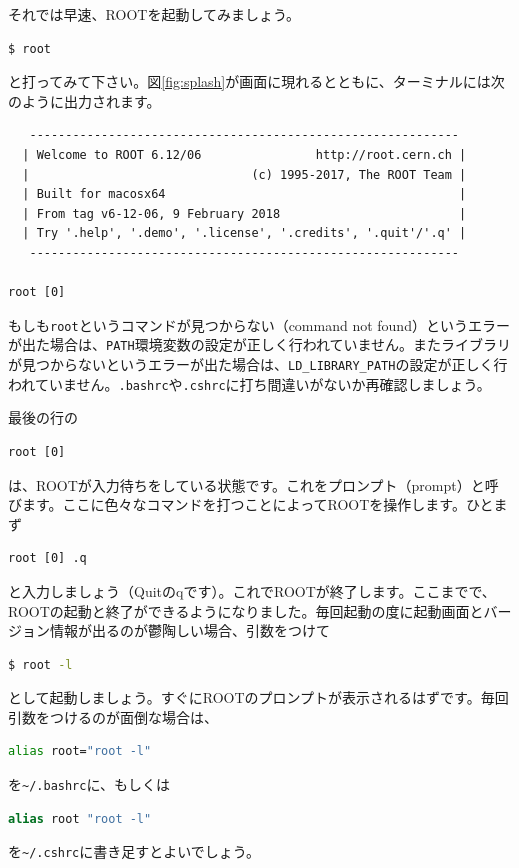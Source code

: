 それでは早速、ROOTを起動してみましょう。
\begin{lstlisting}[language=bash]
$ root
\end{lstlisting}
と打ってみて下さい。図\ref{fig:splash}が画面に現れるとともに、ターミナルには次のように出力されます。
\begin{lstlisting}
   ------------------------------------------------------------
  | Welcome to ROOT 6.12/06                http://root.cern.ch |
  |                               (c) 1995-2017, The ROOT Team |
  | Built for macosx64                                         |
  | From tag v6-12-06, 9 February 2018                         |
  | Try '.help', '.demo', '.license', '.credits', '.quit'/'.q' |
   ------------------------------------------------------------

root [0] 
\end{lstlisting}
もしも\texttt{root}というコマンドが見つからない（command not found）というエラーが出た場合は、\texttt{PATH}環境変数の設定が正しく行われていません。またライブラリが見つからないというエラーが出た場合は、\texttt{LD\_LIBRARY\_PATH}の設定が正しく行われていません。\texttt{.bashrc}や\texttt{.cshrc}に打ち間違いがないか再確認しましょう。

最後の行の
\begin{lstlisting}
root [0]
\end{lstlisting}
は、ROOTが入力待ちをしている状態です。これをプロンプト（prompt）と呼びます。ここに色々なコマンドを打つことによってROOTを操作します。ひとまず
\begin{lstlisting}
root [0] .q
\end{lstlisting}
と入力しましょう（Quitのqです）。これでROOTが終了します。ここまでで、ROOTの起動と終了ができるようになりました。毎回起動の度に起動画面とバージョン情報が出るのが鬱陶しい場合、引数をつけて
\begin{lstlisting}[language=bash]
$ root -l
\end{lstlisting}
として起動しましょう。すぐにROOTのプロンプトが表示されるはずです。毎回引数をつけるのが面倒な場合は、
\begin{lstlisting}[language=bash]
alias root="root -l"
\end{lstlisting}
を\texttt{\~{}/.bashrc}に、もしくは
\begin{lstlisting}[language=csh]
alias root "root -l"
\end{lstlisting}
を\texttt{\~{}/.cshrc}に書き足すとよいでしょう。

